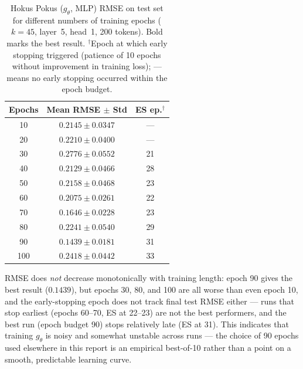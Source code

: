 \begin{table}[ht]
\centering
\caption{Hokus Pokus ($g_\theta$, MLP) RMSE on test set for different numbers of training
epochs ($k=45$, layer~5, head~1, 200 tokens). Bold marks the best result.
$^\dagger$Epoch at which early stopping triggered (patience of 10 epochs without improvement
in training loss); --- means no early stopping occurred within the epoch budget.}
\label{tab:hp_epochs}
\begin{tabular}{c c c}
\toprule
Epochs & Mean RMSE $\pm$ Std & ES ep.$^\dagger$ \\
\midrule
 10  & $0.2145 \pm 0.0347$ & --- \\
 20  & $0.2210 \pm 0.0400$ & --- \\
 30  & $0.2776 \pm 0.0552$ & 21  \\
 40  & $0.2129 \pm 0.0466$ & 28  \\
 50  & $0.2158 \pm 0.0468$ & 23  \\
 60  & $0.2075 \pm 0.0261$ & 22  \\
 70  & $0.1646 \pm 0.0228$ & 23  \\
 80  & $0.2241 \pm 0.0540$ & 29  \\
 90  & $\mathbf{0.1439 \pm 0.0181}$ & 31  \\
100  & $0.2418 \pm 0.0442$ & 33  \\
\bottomrule
\end{tabular}
\end{table}

\noindent RMSE does \emph{not} decrease monotonically with training length: epoch 90 gives the
best result ($0.1439$), but epochs 30, 80, and 100 are all worse than even epoch 10, and the
early-stopping epoch does not track final test RMSE either --- runs that stop earliest (epochs
60--70, ES at 22--23) are not the best performers, and the best run (epoch budget 90) stops
relatively late (ES at 31). This indicates that training $g_\theta$ is noisy and somewhat
unstable across runs --- the choice of 90 epochs used elsewhere in this report is an empirical
best-of-10 rather than a point on a smooth, predictable learning curve.


